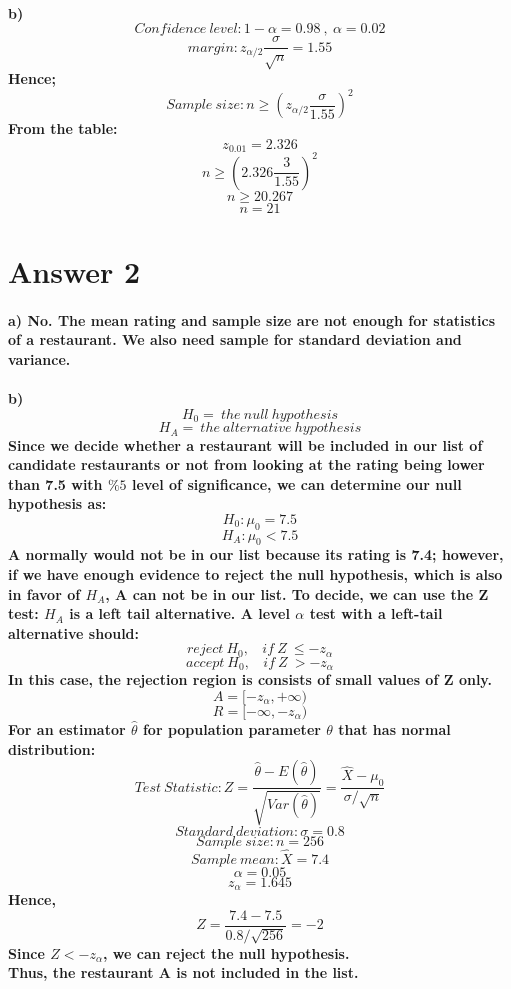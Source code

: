 \documentclass[12pt]{article}
\begin{document}
\paragraph{b)
\[Confidence \ level : 1-\alpha=0.98 \ ,\ \alpha=0.02\]
\[margin : z_{\alpha/2}\frac{\sigma}{\sqrt{n}}=1.55\]
Hence;
\[Sample \ size : n \geq (z_{\alpha/2}\frac{\sigma}{1.55})^2\]
From the table:
\[z_{0.01}=2.326\]
\[n \geq (2.326\frac{3}{1.55})^2\]
\[n \geq 20.267\]
\[n=21\]
}


\section*{Answer 2}
\paragraph{a)
No. The mean rating and sample size are not enough for statistics of a restaurant. We also need sample for standard deviation and variance. 
}
\paragraph{b)
\[H_0= \ the \ null \ hypothesis\]
\[H_A= \ the \ alternative \ hypothesis \]
Since we decide whether a restaurant will be included in our list of candidate restaurants or not from looking at the rating being lower than 7.5 with $\%5$ level of significance, we can determine our null hypothesis as:
\[H_0: \mu_0=7.5\]
\[H_A: \mu_0 < 7.5\]
A normally would not be in our list because its rating is 7.4; however, if we have enough evidence to reject the null hypothesis, which is also in favor of $H_A$, A can not be in our list. 
To decide, we can use the Z test:
$H_A$ is a left tail alternative. 
A level $\alpha$ test with a left-tail alternative should:
\[reject \  H_0, \ \ \ \ if \ Z \ \leq -z_\alpha\]
\[accept \  H_0, \ \ \ \ if \ Z \ > -z_\alpha\]
In this case, the rejection region is consists of small values of Z only. 
\[A=[-z_\alpha, + \infty)\]
\[R=[- \infty, -z_\alpha)\]
For an estimator $\hat{\theta}$ for population parameter $\theta$ that has normal distribution:
\[Test \ Statistic: Z=\frac{\hat{\theta}-E(\hat{\theta})}{\sqrt{Var(\hat{\theta})}}=\frac{\hat{X}-\mu_0}{\sigma/\sqrt{n}}\]
\[Standard \ deviation :\sigma=0.8\]
\[Sample \ size : n=256\]
\[Sample \ mean : \hat{X}=7.4\]
\[\alpha=0.05\]
\[z_\alpha=1.645\]
Hence,
\[Z=\frac{7.4-7.5}{0.8/\sqrt{256}}=-2\]
Since $Z<-z_\alpha$, we can reject the null hypothesis.\\ 
Thus, the restaurant A is not included in the list.
}
\end{document}
